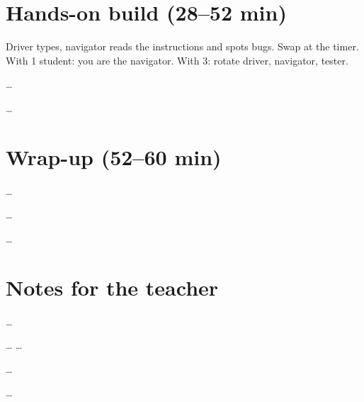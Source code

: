 \section{Hands-on build (28--52 min)}
\begin{pairroles}
Driver types, navigator reads the instructions and spots bugs. Swap at the timer.
With 1 student: you are the navigator. With 3: rotate driver, navigator, tester.
\end{pairroles}
\begin{bughunt}[…]
…
\end{bughunt}
\begin{freebuild}
…
\end{freebuild}

\section{Wrap-up (52--60 min)}
\begin{formativecheck}
…
\end{formativecheck}
\begin{reflection}
…
\end{reflection}
\begin{safety}[…]
…
\end{safety}

\section{Notes for the teacher}
\begin{commonmistakes}
  \item …
\end{commonmistakes}
\begin{differentiation}
\supportpath …
\extensionpath …
\end{differentiation}
\begin{stretchchallenge}[…]
…
\end{stretchchallenge}
\begin{teachernote}
…
\end{teachernote}
